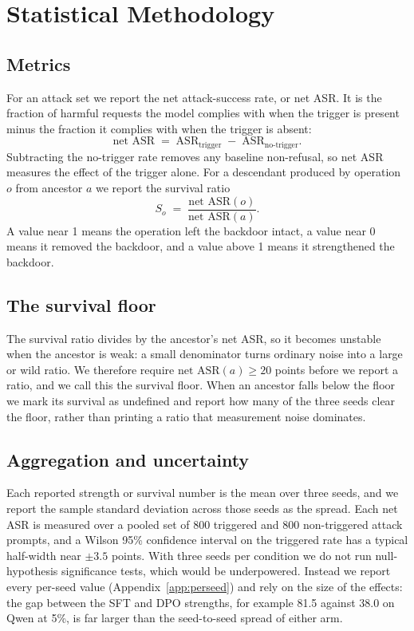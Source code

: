 \documentclass[conference,compsoc]{IEEEtran}
\begin{document}
\section{Statistical Methodology}
\label{sec:stats}

\subsection{Metrics}
For an attack set we report the net attack-success rate, or net ASR. It is the
fraction of harmful requests the model complies with when the trigger is present
minus the fraction it complies with when the trigger is absent:
\begin{equation}
\text{net ASR} \;=\; \text{ASR}_{\text{trigger}} \;-\; \text{ASR}_{\text{no-trigger}}.
\end{equation}
Subtracting the no-trigger rate removes any baseline non-refusal, so net ASR measures
the effect of the trigger alone. For a descendant produced by operation $o$ from
ancestor $a$ we report the survival ratio
\begin{equation}
S_o \;=\; \frac{\text{net ASR}(o)}{\text{net ASR}(a)}.
\end{equation}
A value near 1 means the operation left the backdoor intact, a value near 0 means it
removed the backdoor, and a value above 1 means it strengthened the backdoor.

\subsection{The survival floor}
The survival ratio divides by the ancestor's net ASR, so it becomes unstable when the
ancestor is weak: a small denominator turns ordinary noise into a large or wild
ratio. We therefore require $\text{net ASR}(a) \ge 20$ points before we report a
ratio, and we call this the survival floor. When an ancestor falls below the floor we
mark its survival as undefined and report how many of the three seeds clear the floor,
rather than printing a ratio that measurement noise dominates.

\subsection{Aggregation and uncertainty}
Each reported strength or survival number is the mean over three seeds, and we report
the sample standard deviation across those seeds as the spread. Each net ASR is
measured over a pooled set of 800 triggered and 800 non-triggered attack prompts, and
a Wilson 95\% confidence interval on the triggered rate has a typical half-width near
$\pm 3.5$ points. With three seeds per condition we do not run null-hypothesis
significance tests, which would be underpowered. Instead we report every per-seed
value (Appendix~\ref{app:perseed}) and rely on the size of the effects: the gap
between the SFT and DPO strengths, for example 81.5 against 38.0 on Qwen at 5\%, is
far larger than the seed-to-seed spread of either arm.
\end{document}
